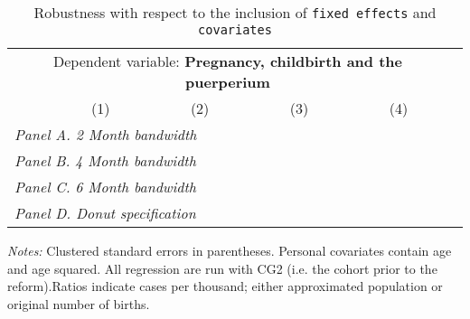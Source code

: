  \begin{table}[H] \begin{threeparttable} \centering \caption{Robustness with respect to the inclusion of \texttt{fixed effects} and \texttt{covariates}} {\def\sym#1{\ifmmode^{#1}\else\(^{#1}\)\fi} \begin{tabular}{l*{5}{c}} \toprule \multicolumn{5}{c}{Dependent variable: \textbf{Pregnancy, childbirth and the puerperium}} \\ \cmidrule(lr){2-5}
            &\multicolumn{1}{c}{(1)}&\multicolumn{1}{c}{(2)}&\multicolumn{1}{c}{(3)}&\multicolumn{1}{c}{(4)}\\
\midrule
 \multicolumn{5}{l}{\emph{Panel A. 2 Month bandwidth}} \\    \midrule\multicolumn{5}{l}{\emph{Panel B. 4 Month bandwidth}} \\    \midrule\multicolumn{5}{l}{\emph{Panel C. 6 Month bandwidth}} \\    \midrule\multicolumn{5}{l}{\emph{Panel D. Donut specification}} \\    \midrule  
\bottomrule \end{tabular} } \begin{tablenotes} \item \scriptsize \emph{Notes:} Clustered standard errors in parentheses. Personal covariates contain age and age squared. All regression are run with CG2 (i.e. the cohort prior to the reform).Ratios indicate cases per thousand; either approximated population or original number of births. \end{tablenotes} \end{threeparttable} \end{table} 
